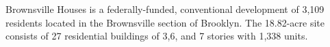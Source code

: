 

 

Brownsville Houses is a federally-funded, conventional development of 3,109 residents located in the Brownsville section of Brooklyn. The 18.82-acre site consists of 27 residential buildings of 3,6, and 7 stories with 1,338 units. 